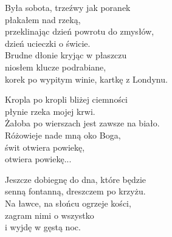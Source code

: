 \begin{text}
    Była sobota, trzeźwy jak poranek\\
    płakałem nad rzeką,\\
    przeklinając dzień powrotu do zmysłów,\\
    dzień ucieczki o świcie.\\
    Brudne dłonie kryjąc w płaszczu\\
    niosłem klucze podrabiane,\\
    korek po wypitym winie, kartkę z Londynu.

    Kropla po kropli bliżej ciemności\\
    płynie rzeka mojej krwi.\\
    Żałoba po wierszach jest zawsze na biało.\\
    Różowieje nade mną oko Boga,\\
    świt otwiera powiekę,\\
    otwiera powiekę...

    Jeszcze dobiegnę do dna, które będzie\\
    senną fontanną, dreszczem po krzyżu.\\
    Na ławce, na słońcu ogrzeje kości,\\
    zagram nimi o wszystko\\
    i wyjdę w gęstą noc.
\end{text}
\begin{chord}

\end{chord}